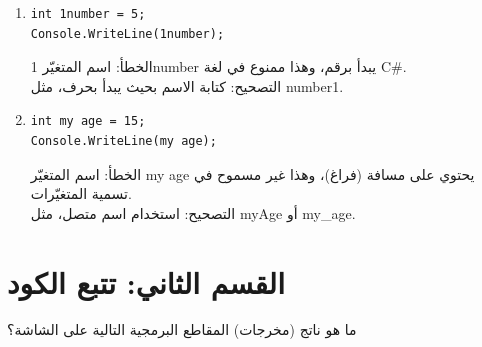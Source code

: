 \documentclass[14pt]{extarticle}
\begin{document}
\begin{enumerate}[itemsep=2em]
\item
\begin{english}
\begin{verbatim}
int 1number = 5;
Console.WriteLine(1number);
\end{verbatim}
\end{english}
\ifwithsols
\begin{boxSolution}
الخطأ: اسم المتغيّر \textenglish{1number} يبدأ برقم، وهذا ممنوع في لغة \textenglish{C\#}. \\
التصحيح: كتابة الاسم بحيث يبدأ بحرف، مثل \textenglish{number1}.
\end{boxSolution}
\fi

\item
\begin{english}
\begin{verbatim}
int my age = 15;
Console.WriteLine(my age);
\end{verbatim}
\end{english}
\ifwithsols
\begin{boxSolution}
الخطأ: اسم المتغيّر \textenglish{my age} يحتوي على مسافة (فراغ)، وهذا غير مسموح في تسمية المتغيّرات. \\
التصحيح: استخدام اسم متصل، مثل \textenglish{myAge} أو \textenglish{my\_age}.
\end{boxSolution}
\fi

\end{enumerate}

\clearpage

\section*{القسم الثاني: تتبع الكود}
ما هو ناتج (مخرجات) المقاطع البرمجية التالية على الشاشة؟
\end{document}
